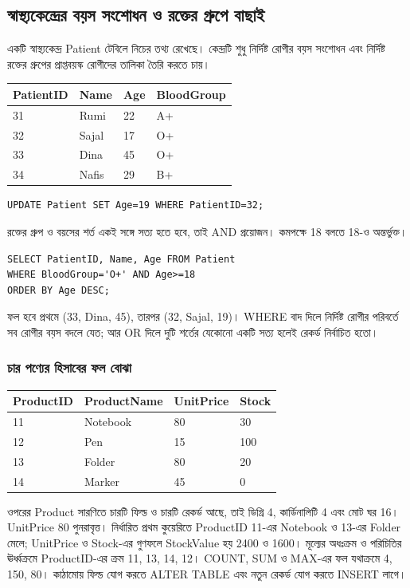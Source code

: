 \subsection{স্বাস্থ্যকেন্দ্রের বয়স সংশোধন ও রক্তের গ্রুপে বাছাই}
একটি স্বাস্থ্যকেন্দ্র Patient টেবিলে নিচের তথ্য রেখেছে। কেন্দ্রটি শুধু নির্দিষ্ট রোগীর বয়স সংশোধন এবং নির্দিষ্ট রক্তের গ্রুপের প্রাপ্তবয়স্ক রোগীদের তালিকা তৈরি করতে চায়।
\begin{flushleft}\small
\begin{tabular}{|l|l|l|l|}\hline
PatientID & Name & Age & BloodGroup\\\hline
31 & Rumi & 22 & A+\\\hline
32 & Sajal & 17 & O+\\\hline
33 & Dina & 45 & O+\\\hline
34 & Nafis & 29 & B+\\\hline
\end{tabular}
\end{flushleft}
\begin{verbatim}
UPDATE Patient SET Age=19 WHERE PatientID=32;
\end{verbatim}
রক্তের গ্রুপ ও বয়সের শর্ত একই সঙ্গে সত্য হতে হবে, তাই AND প্রয়োজন। কমপক্ষে 18 বলতে 18-ও অন্তর্ভুক্ত।
\begin{verbatim}
SELECT PatientID, Name, Age FROM Patient
WHERE BloodGroup='O+' AND Age>=18
ORDER BY Age DESC;
\end{verbatim}
ফল হবে প্রথমে (33, Dina, 45), তারপর (32, Sajal, 19)। WHERE বাদ দিলে নির্দিষ্ট রোগীর পরিবর্তে সব রোগীর বয়স বদলে যেত; আর OR দিলে দুটি শর্তের যেকোনো একটি সত্য হলেই রেকর্ড নির্বাচিত হতো।

\subsubsection{চার পণ্যের হিসাবের ফল বোঝা}
\begin{flushleft}\small
\begin{tabular}{|l|l|l|l|}\hline
ProductID & ProductName & UnitPrice & Stock\\\hline
11 & Notebook & 80 & 30\\\hline
12 & Pen & 15 & 100\\\hline
13 & Folder & 80 & 20\\\hline
14 & Marker & 45 & 0\\\hline
\end{tabular}
\end{flushleft}
ওপরের Product সারণিতে চারটি ফিল্ড ও চারটি রেকর্ড আছে, তাই ডিগ্রি 4, কার্ডিনালিটি 4 এবং মোট ঘর 16। UnitPrice 80 পুনরাবৃত্ত। নির্ধারিত প্রথম কুয়েরিতে ProductID 11-এর Notebook ও 13-এর Folder মেলে; UnitPrice ও Stock-এর গুণফলে StockValue হয় 2400 ও 1600। মূল্যের অধঃক্রম ও পরিচিতির ঊর্ধ্বক্রমে ProductID-এর ক্রম 11, 13, 14, 12। COUNT, SUM ও MAX-এর ফল যথাক্রমে 4, 150, 80। কাঠামোয় ফিল্ড যোগ করতে ALTER TABLE এবং নতুন রেকর্ড যোগ করতে INSERT লাগে।

